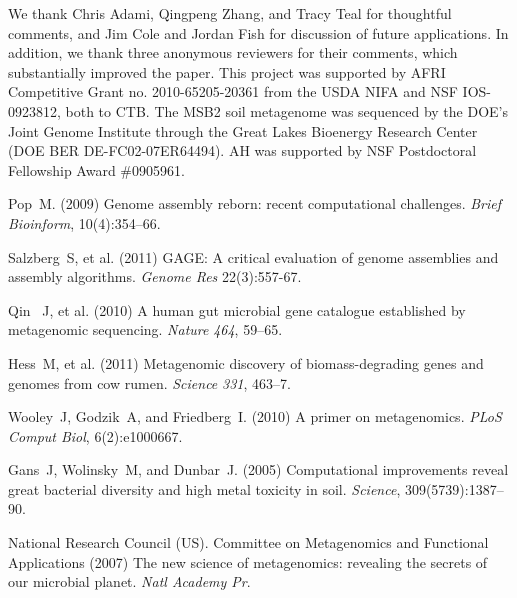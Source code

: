 \documentclass[draft]{pnastwo}
\begin{document}
\begin{article}
\begin{materials}
\end{materials}

\begin{acknowledgments}

We thank Chris Adami, Qingpeng Zhang, and Tracy Teal for thoughtful
comments, and Jim Cole and Jordan Fish for discussion of future
applications.  In addition, we thank three anonymous reviewers for
their comments, which substantially improved the paper.  This project
was supported by AFRI Competitive Grant no. 2010-65205-20361 from the
USDA NIFA and NSF IOS-0923812, both to CTB.  The MSB2 soil metagenome
was sequenced by the DOE's Joint Genome Institute through the Great
Lakes Bioenergy Research Center (DOE BER DE-FC02-07ER64494).  AH was
supported by NSF Postdoctoral Fellowship Award \#0905961.


\end{acknowledgments}


%

%

\begin{thebibliography}{10}

 Pop~M. (2009) Genome assembly reborn: recent 
computational challenges. {\it Brief Bioinform}, 10(4):354--66.

 Salzberg~S, et al. (2011) GAGE: A critical 
evaluation of genome assemblies and assembly algorithms. {\it Genome Res} 
22(3):557-67.

 Qin ~J, et al. (2010) A human gut microbial gene catalogue 
established by metagenomic sequencing. {\it Nature} \emph{464}, 59--65.

 Hess~M, et al. (2011) Metagenomic discovery of 
biomass-degrading genes and genomes from cow rumen. {\it Science} 
\emph{331}, 463--7.

 Wooley~J, Godzik~A, and Friedberg~I. (2010) A primer 
on metagenomics. {\it PLoS Comput Biol}, 6(2):e1000667.

 Gans~J, Wolinsky~M, and Dunbar~J. (2005) 
Computational improvements reveal great bacterial diversity and high metal 
toxicity in soil. {\it Science}, 309(5739):1387--90.

 National Research Council (US). Committee on Metagenomics 
and Functional Applications (2007) The new science of metagenomics: revealing 
the secrets of our microbial planet. {\it Natl Academy Pr}.


\end{thebibliography}
\end{article}
\end{document}

